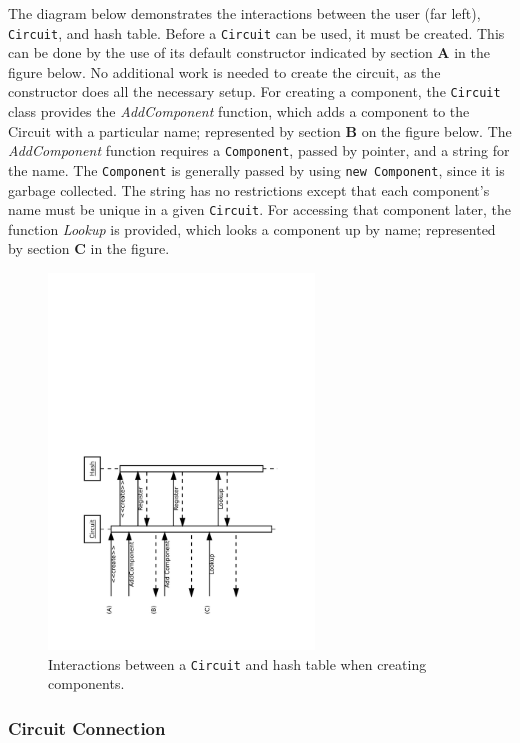 \documentclass{article}
\newcommand{\Bold}[1]{\textbf{#1}}
\newcommand{\ClassName}[1]{\texttt{#1}}
\newcommand{\FunctionName}[1]{\textit{#1}}
\begin{document}
The diagram below demonstrates the interactions between the user (far left), \ClassName{Circuit}, and hash table. Before a \ClassName{Circuit} can be used, it must be created. This can be done by the use of its default constructor indicated by section \Bold{A} in the figure below. No additional work is needed to create the circuit, as the constructor does all the necessary setup. For creating a component, the \ClassName{Circuit} class provides the \FunctionName{AddComponent} function, which adds a component to the Circuit with a particular name; represented by section \Bold{B} on the figure below. The \FunctionName{AddComponent} function requires a \ClassName{Component}, passed by pointer, and a string for the name. The \ClassName{Component} is generally passed by using \ClassName{new Component}, since it is garbage collected. The string has no restrictions except that each component’s name must be unique in a given \ClassName{Circuit}. For accessing that component later, the function \FunctionName{Lookup} is
provided, which looks a component up by name; represented by section \Bold{C} in the figure.

\begin{figure}[H]
    \begin{center}
        \includegraphics[angle=270,width=200pt]{imgs/ComponentCreationInteraction.pdf}
    \end{center}
    \caption{Interactions between a \ClassName{Circuit} and hash table when creating components.}
\end{figure}

\subsubsection{Circuit Connection}
\end{document}
